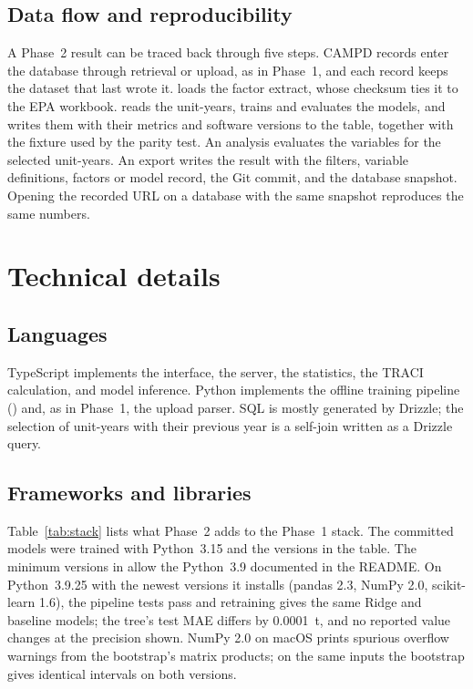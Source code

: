 \documentclass[11pt,a4paper]{article}
\begin{document}
\subsection{Data flow and reproducibility}

A Phase~2 result can be traced back through five steps. CAMPD records enter the database
through retrieval or upload, as in Phase~1, and each record keeps the dataset that last wrote
it.  loads the factor extract, whose checksum ties it to the EPA
workbook.  reads the unit-years, trains and evaluates the models, and
writes them with their metrics and software versions to the  table, together with
the fixture used by the parity test. An analysis evaluates the variables for the selected
unit-years. An export writes the result with the filters, variable definitions, factors or model
record, the Git commit, and the database snapshot. Opening the recorded URL on a database with
the same snapshot reproduces the same numbers.

\section{Technical details}
\label{sec:technical}

\subsection{Languages}

TypeScript implements the interface, the server, the statistics, the TRACI calculation, and
model inference. Python implements the offline training pipeline () and, as in
Phase~1, the upload parser. SQL is mostly generated by Drizzle; the selection of unit-years with
their previous year is a self-join written as a Drizzle query.

\subsection{Frameworks and libraries}

Table~\ref{tab:stack} lists what Phase~2 adds to the Phase~1 stack. The committed models were
trained with Python~3.15 and the versions in the table. The minimum versions in
 allow the Python~3.9 documented in the README. On Python~3.9.25 with the
newest versions it installs (pandas 2.3, NumPy 2.0, scikit-learn 1.6), the pipeline tests pass
and retraining gives the same Ridge and baseline models; the tree's test MAE differs by
0.0001~t, and no reported value changes at the precision shown. NumPy 2.0 on macOS prints
spurious overflow warnings from the bootstrap's matrix products; on the same inputs the bootstrap
gives identical intervals on both versions.
\end{document}
